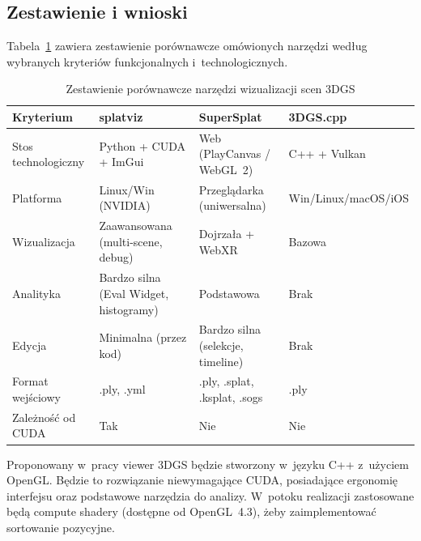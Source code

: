 \subsection{Zestawienie i wnioski}
\label{subsec:zestawienie}

Tabela~\ref{tab:porownanie} zawiera zestawienie porównawcze omówionych
narzędzi według wybranych kryteriów funkcjonalnych i~technologicznych.

\begin{table}[htbp]
  \centering
  \caption{Zestawienie porównawcze narzędzi wizualizacji scen 3DGS}
  \label{tab:porownanie}
  \small
  \renewcommand{\arraystretch}{1.2}
  \begin{tabularx}{\textwidth}{
      >{\raggedright\arraybackslash}p{}
      >{\raggedright\arraybackslash}X
      >{\raggedright\arraybackslash}X
      >{\raggedright\arraybackslash}X}
    \toprule
    \textbf{Kryterium} & \textbf{splatviz} & \textbf{SuperSplat} & \textbf{3DGS.cpp} \\
    \midrule
    Stos technologiczny & Python + CUDA + ImGui & Web (PlayCanvas / WebGL~2) & C++ + Vulkan \\
    Platforma           & Linux/Win (NVIDIA) & Przeglądarka (uniwersalna) & Win/\allowbreak Linux/\allowbreak macOS/\allowbreak iOS \\
    Wizualizacja        & Zaawansowana (multi-scene, debug) & Dojrzała + WebXR & Bazowa \\
    Analityka           & Bardzo silna (Eval Widget, histogramy) & Podstawowa & Brak \\
    Edycja              & Minimalna (przez kod) & Bardzo silna (selekcje, timeline) & Brak \\
    Format wejściowy    & .ply, .yml & .ply, .splat, .ksplat, .sogs & .ply \\
    Zależność od CUDA   & Tak & Nie & Nie \\
    \bottomrule
  \end{tabularx}
\end{table}

Proponowany w~pracy viewer 3DGS będzie stworzony w~języku C++ z~użyciem
OpenGL. Będzie to rozwiązanie niewymagające CUDA, posiadające ergonomię
interfejsu oraz podstawowe narzędzia do analizy. W~potoku realizacji
zastosowane będą compute shadery (dostępne od OpenGL~4.3), żeby
zaimplementować sortowanie pozycyjne.
